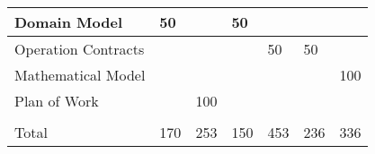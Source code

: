 \documentclass[letterpaper,english, 12pt]{scrreprt}
\begin{document}
\begin{center}
\begin{tabular}{|l|C{2cm}|C{1.5cm}|C{1.5cm}|C{1.5cm}|C{1.5cm}|C{1.5cm}|}
Domain Model            &      50       &               &       50      &               &               &               \\ \hline
Operation Contracts     &               &               &               &      50       &       50      &               \\ \hline
Mathematical Model      &               &               &               &               &               &      100      \\ \hline

Plan of Work            &               &     100       &               &               &               &               \\ \hline

                        &               &               &               &               &               &               \\ \hline
Total                   &     170       &     253       &      150      &     453       &      236      &      336      \\ \hline
	\end{tabular}
\end{center}
\end{document}
